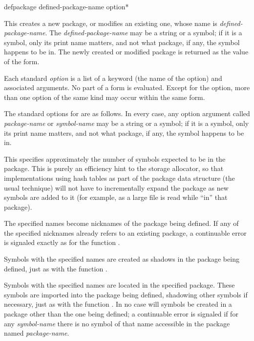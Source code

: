 \begin{defmac}
defpackage defined-package-name {option}*

This creates a new package, or modifies an existing one, whose name
is \emph{defined-package-name}.  The \emph{defined-package-name}
may be a string or a symbol;
if it is a symbol, only its print name matters, and not what package, if any,
the symbol happens to be in.
The newly created or modified package is returned as the value of
the  form.

Each standard \emph{option} is a list of a keyword (the name of the option)
and associated arguments.  No part of a  form is evaluated.
Except for the  option, more than one option of the same
kind may occur within the same  form.

The standard options for  are as follows.
In every case, any option argument called \emph{package-name}
or \emph{symbol-name}
may be a string or a symbol;
if it is a symbol, only its print name matters, and not what package, if any,
the symbol happens to be in.

\begin{flushdesc}
\item[\cd{(:size \emph{integer})}]
This specifies approximately the number of symbols expected to be in the
package.  This is purely an efficiency hint to the storage allocator,
so that implementations using hash tables as part
of the package data structure (the usual technique) will not
have to incrementally expand the package as new symbols are added to it
(for example, as a large file is read while ``in'' that package).

\item[\cd{(:nicknames \Mstar\emph{package-name})}]
The specified names become nicknames of the package being defined.
If any of the specified nicknames already refers to an existing
package, a continuable error is signaled exactly as for the
function .

\item[\cd{(:shadow \Mstar\emph{symbol-name})}]
Symbols with the specified names are created as shadows
in the package being defined, just as with the function .

\item[\cd{(:shadowing-import-from \emph{package-name} \Mstar\emph{symbol-name})}]
Symbols with the specified names are located in the specified package.
These symbols are imported into the package being defined, shadowing
other symbols if necessary, just as with the function .
In no case will symbols be created in a package other than
the one being defined;
a continuable error is signaled if for any \emph{symbol-name} there
is no symbol of that name accessible in the package named \emph{package-name}.


\end{flushdesc}
\end{defmac}
